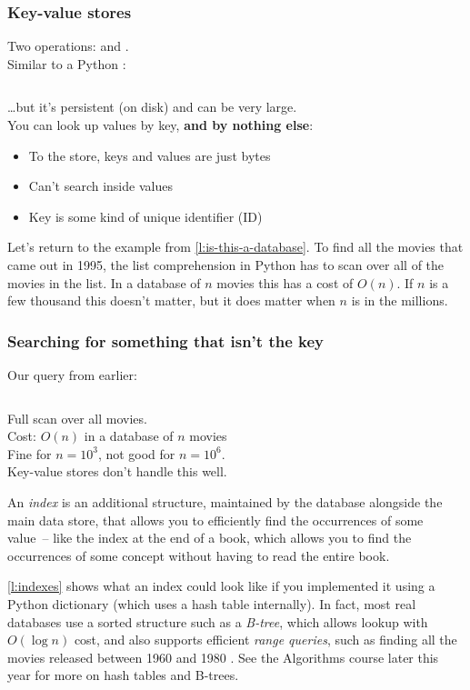 \begin{frame}
    \label{s:key-value}
    \frametitle{Key-value stores}
    Two operations:  and .\\
    Similar to a Python :
    \inputminted[fontsize=\footnotesize]{python}{code/key-value-python.py}
    \vspace{0.4em}
    \dots{}but it's persistent (on disk) and can be very large.\\[1em]\pause
    You can look up values by key, \textbf{and by nothing else}:
    \begin{itemize}
        \item To the store, keys and values are just bytes
        \item Can't search inside values
        \item Key is some kind of unique identifier (ID)
    \end{itemize}
\end{frame}
\label{l:key-value}

Let's return to the example from \autoref{l:is-this-a-database}.
To find all the movies that came out in 1995, the list comprehension in Python has to scan over all of the movies in the list.
In a database of $n$ movies this has a cost of $O(n)$.
If $n$ is a few thousand this doesn't matter, but it does matter when $n$ is in the millions.

\begin{frame}
    \label{s:full-scan}
    \frametitle{Searching for something that isn't the key}
    Our query from earlier:
    \inputminted[fontsize=\footnotesize]{python}{code/scan-python.py}
    \vspace{0.5em}\pause
    Full scan over all movies.\\
    Cost: $O(n)$ in a database of $n$ movies\\[0.8em]
    Fine for $n = 10^3$, not good for $n = 10^6$.\\[0.8em]
    Key-value stores don't handle this well.
\end{frame}
\label{l:full-scan}

An \emph{index} is an additional structure, maintained by the database alongside the main data store, that allows you to efficiently find the occurrences of some value~-- like the index at the end of a book, which allows you to find the occurrences of some concept without having to read the entire book.

\autoref{l:indexes} shows what an index could look like if you implemented it using a Python dictionary (which uses a hash table internally).
In fact, most real databases use a sorted structure such as a \emph{B-tree}, which allows lookup with $O(\log n)$ cost, and also supports efficient \emph{range queries}, such as finding all the movies released between 1960 and 1980 \citep{Jones2019}.
See the Algorithms course later this year for more on hash tables and B-trees.

